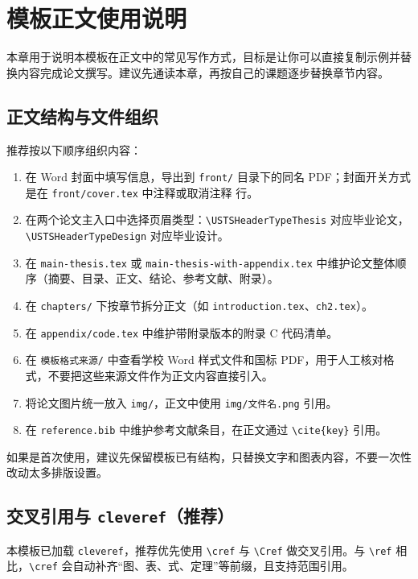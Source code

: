 \chapter{模板正文使用说明}\label{chap:usage}

本章用于说明本模板在正文中的常见写作方式，目标是让你可以直接复制示例并替换内容完成论文撰写。建议先通读本章，再按自己的课题逐步替换章节内容。

\section{正文结构与文件组织}

推荐按以下顺序组织内容：
\begin{enumerate}
  \item 在 Word 封面中填写信息，导出到 \verb|front/| 目录下的同名 PDF；封面开关方式是在 \verb|front/cover.tex| 中注释或取消注释 \verb|| 行。
  \item 在两个论文主入口中选择页眉类型：\verb|\USTSHeaderTypeThesis| 对应毕业论文，\verb|\USTSHeaderTypeDesign| 对应毕业设计。
  \item 在 \verb|main-thesis.tex| 或 \verb|main-thesis-with-appendix.tex| 中维护论文整体顺序（摘要、目录、正文、结论、参考文献、附录）。
  \item 在 \verb|chapters/| 下按章节拆分正文（如 \verb|introduction.tex|、\verb|ch2.tex|）。
  \item 在 \verb|appendix/code.tex| 中维护带附录版本的附录 C 代码清单。
  \item 在 \verb|模板格式来源/| 中查看学校 Word 样式文件和国标 PDF，用于人工核对格式，不要把这些来源文件作为正文内容直接引入。
  \item 将论文图片统一放入 \verb|img/|，正文中使用 \verb|img/文件名.png| 引用。
  \item 在 \verb|reference.bib| 中维护参考文献条目，在正文通过 \verb|\cite{key}| 引用。
\end{enumerate}

如果是首次使用，建议先保留模板已有结构，只替换文字和图表内容，不要一次性改动太多排版设置。

\section{交叉引用与 \texttt{cleveref}（推荐）}\label{sec:usage-crossref}

本模板已加载 \verb|cleveref|，推荐优先使用 \verb|\cref| 与 \verb|\Cref| 做交叉引用。与 \verb|\ref| 相比，\verb|\cref| 会自动补齐“图、表、式、定理”等前缀，且支持范围引用。

